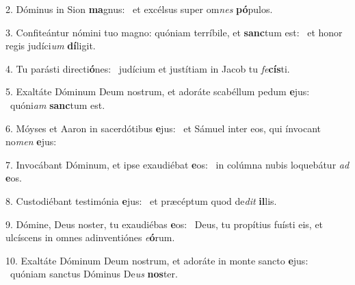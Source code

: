 2. Dóminus in Sion \textbf{ma}gnus: \ast\  et excélsus super om\textit{nes} \textbf{pó}pulos.\

3. Confiteántur nómini tuo magno: quóniam terríbile, et \textbf{sanc}tum est: \ast\  et honor regis judíci\textit{um} \textbf{dí}ligit.\

4. Tu parásti directi\textbf{ó}nes: \ast\  judícium et justítiam in Jacob tu \textit{fe}\textbf{cís}ti.\

5. Exaltáte Dóminum Deum nostrum, et adoráte scabéllum pedum \textbf{e}jus: \ast\  quóni\textit{am} \textbf{sanc}tum est.\

6. Móyses et Aaron in sacerdótibus \textbf{e}jus: \ast\  et Sámuel inter eos, qui ínvocant no\textit{men} \textbf{e}jus:\

7. Invocábant Dóminum, et ipse exaudiébat \textbf{e}os: \ast\  in colúmna nubis loquebátur \textit{ad} \textbf{e}os.\

8. Custodiébant testimónia \textbf{e}jus: \ast\  et præcéptum quod de\textit{dit} \textbf{il}lis.\

9. Dómine, Deus noster, tu exaudiébas \textbf{e}os: \ast\  Deus, tu propítius fuísti eis, et ulcíscens in omnes adinventiónes \textit{e}\textbf{ó}rum.\

10. Exaltáte Dóminum Deum nostrum, et adoráte in monte sancto \textbf{e}jus: \ast\  quóniam sanctus Dóminus De\textit{us} \textbf{nos}ter.\

